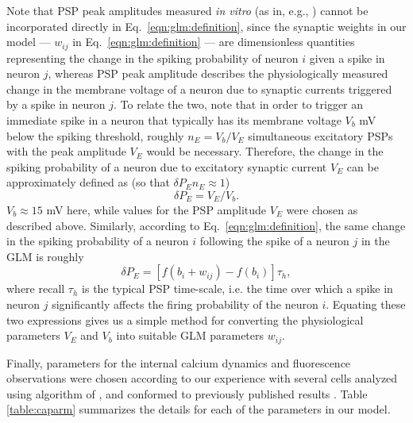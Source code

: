 \documentclass[aoas,preprint]{imsart}
\begin{document}
Note that PSP peak amplitudes measured \emph{in vitro} (as in, e.g.,
\cite{Song2005}) cannot be incorporated directly in
Eq.~\eqref{eqn:glm:definition}, since the synaptic weights in our
model --- $w_{ij}$ in Eq.~\eqref{eqn:glm:definition} --- are
dimensionless quantities representing the change in the spiking
probability of neuron $i$ given a spike in neuron $j$, whereas PSP
peak amplitude describes the physiologically measured change in the
membrane voltage of a neuron due to synaptic currents triggered by a
spike in neuron $j$.  To relate the two, note that in order to trigger
an immediate spike in a neuron that typically has its membrane voltage
$V_b$ mV below the spiking threshold, roughly $n_E = V_b / V_E$
simultaneous excitatory PSPs with the peak amplitude $V_E$ would be
necessary.  Therefore, the change in the spiking probability of a
neuron due to excitatory synaptic current $V_E$ can be approximately
defined as (so that $\delta P_E n_E \approx 1$)
\begin{equation}\label{eqn:convert:leadin-1}
\delta P_E = V_E/V_b.
\end{equation}
$V_b \approx 15$ mV here, while values for the PSP amplitude $V_E$
were chosen as described above.  Similarly, according to
Eq.~\ref{eqn:glm:definition}, the same change in the spiking
probability of a neuron $i$ following the spike of a neuron $j$ in the
GLM is roughly
\begin{equation}\label{eqn:convert:leadin-2}
\delta P_E = \left[ f(b_i + w_{ij}) - f(b_i) \right] \tau_h,
\end{equation}
where recall $\tau_h$ is the typical PSP time-scale, i.e. the time
over which a spike in neuron $j$ significantly affects the firing
probability of the neuron $i$.  Equating these two expressions gives
us a simple method for converting the physiological parameters $V_E$
and $V_b$ into suitable GLM parameters $w_{ij}$.

Finally, parameters for the internal calcium dynamics and fluorescence
observations were chosen according to our experience with several
cells analyzed using algorithm of \cite{Vogelstein2009}, and conformed
to previously published results
\cite{ImagingManual,HelmchenSakmann96,BrenowitzRegehr07}. Table
\ref{table:caparm} summarizes the details for each of the parameters
in our model.
\end{document}
